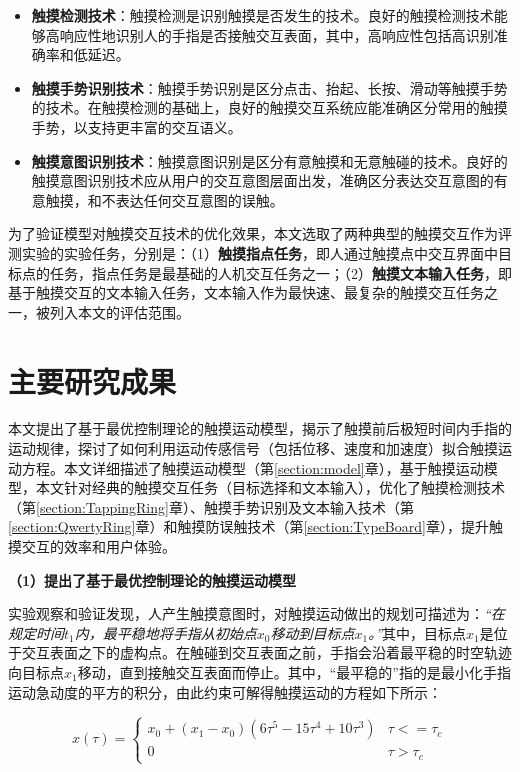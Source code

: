 \begin{itemize}
\item \textbf{触摸检测技术}：触摸检测是识别触摸是否发生的技术。良好的触摸检测技术能够高响应性地识别人的手指是否接触交互表面，其中，高响应性包括高识别准确率和低延迟。
\item \textbf{触摸手势识别技术}：触摸手势识别是区分点击、抬起、长按、滑动等触摸手势的技术。在触摸检测的基础上，良好的触摸交互系统应能准确区分常用的触摸手势，以支持更丰富的交互语义。
\item \textbf{触摸意图识别技术}：触摸意图识别是区分有意触摸和无意触碰的技术。良好的触摸意图识别技术应从用户的交互意图层面出发，准确区分表达交互意图的有意触摸，和不表达任何交互意图的误触。
\end{itemize}

为了验证模型对触摸交互技术的优化效果，本文选取了两种典型的触摸交互作为评测实验的实验任务，分别是：（1）\textbf{触摸指点任务}，即人通过触摸点中交互界面中目标点的任务，指点任务是最基础的人机交互任务之一；（2）\textbf{触摸文本输入任务}，即基于触摸交互的文本输入任务，文本输入作为最快速、最复杂的触摸交互任务之一，被列入本文的评估范围。

\section{主要研究成果}

本文提出了基于最优控制理论的触摸运动模型，揭示了触摸前后极短时间内手指的运动规律，探讨了如何利用运动传感信号（包括位移、速度和加速度）拟合触摸运动方程。本文详细描述了触摸运动模型（第\ref{section:model}章），基于触摸运动模型，本文针对经典的触摸交互任务（目标选择和文本输入），优化了触摸检测技术（第\ref{section:TappingRing}章）、触摸手势识别及文本输入技术（第\ref{section:QwertyRing}章）和触摸防误触技术（第\ref{section:TypeBoard}章），提升触摸交互的效率和用户体验。

\textbf{（1）提出了基于最优控制理论的触摸运动模型}

实验观察和验证发现，人产生触摸意图时，对触摸运动做出的规划可描述为：\emph{“在规定时间$t_1$内，最平稳地将手指从初始点$x_0$移动到目标点$x_1$。”}其中，目标点$x_1$是位于交互表面之下的虚构点。在触碰到交互表面之前，手指会沿着最平稳的时空轨迹向目标点$x_1$移动，直到接触交互表面而停止。其中，“最平稳的”指的是最小化手指运动急动度的平方的积分\cite{flash1985coordination}，由此约束可解得触摸运动的方程如下所示：

\begin{equation}
x(\tau)=
\begin{cases}
x_0+(x_1-x_0)(6\tau^5-15\tau^4+10\tau^3)& \tau<=\tau_c \\
0& \tau>\tau_c
\end{cases}
\end{equation}

